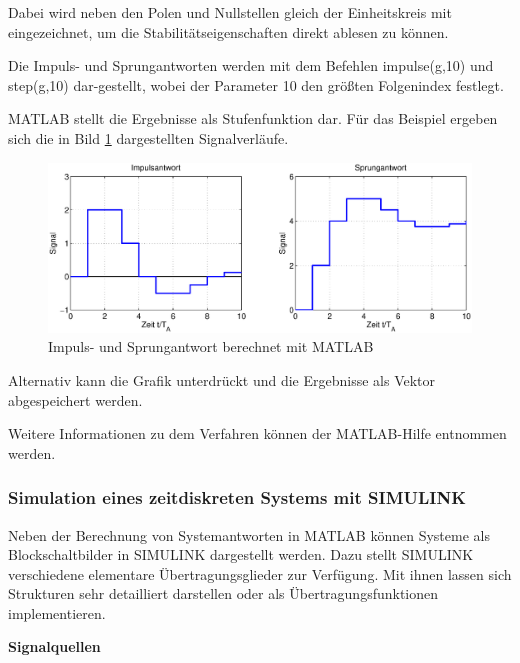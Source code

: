 \noindent Dabei wird neben den Polen und Nullstellen gleich der Einheitskreis mit eingezeichnet, um die Stabilitätseigenschaften direkt ablesen zu können.

\noindent Die Impuls- und Sprungantworten werden mit dem Befehlen impulse(g,10) und step(g,10) dar-gestellt, wobei der Parameter 10 den größten Folgenindex festlegt.



\noindent MATLAB stellt die Ergebnisse als Stufenfunktion dar. Für das Beispiel ergeben sich die in Bild \ref{fig:SystemInterpretationMatlab1} dargestellten Signalverläufe.

\begin{figure}[H]
  \centerline{\includegraphics[width=1\textwidth]{Kapitel6/Bilder/image16.eps}}
  \caption{Impuls- und Sprungantwort berechnet mit MATLAB}
  \label{fig:SystemInterpretationMatlab1}
\end{figure}

\noindent Alternativ kann die Grafik unterdrückt und die Ergebnisse als Vektor abgespeichert werden. 



\noindent Weitere Informationen zu dem Verfahren können der MATLAB-Hilfe entnommen werden.

\subsubsection{Simulation eines zeitdiskreten Systems mit SIMULINK}

\noindent Neben der Berechnung von Systemantworten in MATLAB k\"{o}nnen Systeme als Blockschaltbilder in SIMULINK dargestellt werden. Dazu stellt SIMULINK verschiedene elementare \"{U}bertragungsglieder zur Verf\"{u}gung. Mit ihnen lassen sich Strukturen sehr detailliert darstellen oder als \"{U}bertragungsfunktionen implementieren.\bigskip

{\selectfont
\noindent\textbf{Signalquellen}}\smallskip

